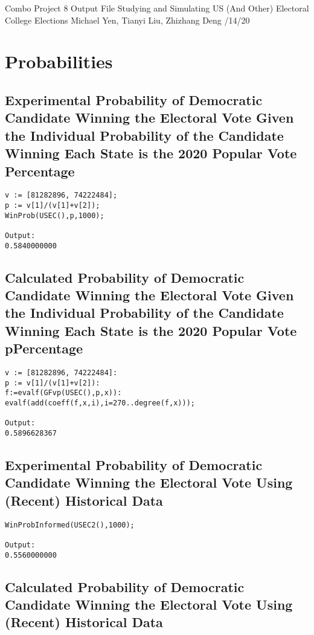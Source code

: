 \documentclass[12pt]{article}
\begin{document}
\noindent
Combo Project 8 Output File \newline
Studying and Simulating US (And Other) Electoral College Elections \newline
Michael Yen, Tianyi Liu, Zhizhang Deng /14/20

\section{Probabilities}
\subsection{Experimental Probability of Democratic Candidate Winning the Electoral Vote Given the Individual Probability of the Candidate Winning Each State is the 2020 Popular Vote Percentage}

\begin{verbatim}
v := [81282896, 74222484];
p := v[1]/(v[1]+v[2]);
WinProb(USEC(),p,1000);

Output:
0.5840000000
\end{verbatim}

\subsection{Calculated Probability of Democratic Candidate Winning the Electoral Vote Given the Individual Probability of the Candidate Winning Each State is the 2020 Popular Vote pPercentage}

\begin{verbatim}
v := [81282896, 74222484]:
p := v[1]/(v[1]+v[2]):
f:=evalf(GFvp(USEC(),p,x)):
evalf(add(coeff(f,x,i),i=270..degree(f,x)));

Output:
0.5896628367
\end{verbatim}

\subsection{Experimental Probability of Democratic Candidate Winning the Electoral Vote Using (Recent) Historical Data}

\begin{verbatim}
WinProbInformed(USEC2(),1000);

Output:
0.5560000000
\end{verbatim}

\subsection{Calculated Probability of Democratic Candidate Winning the Electoral Vote Using (Recent) Historical Data}
\end{document}
